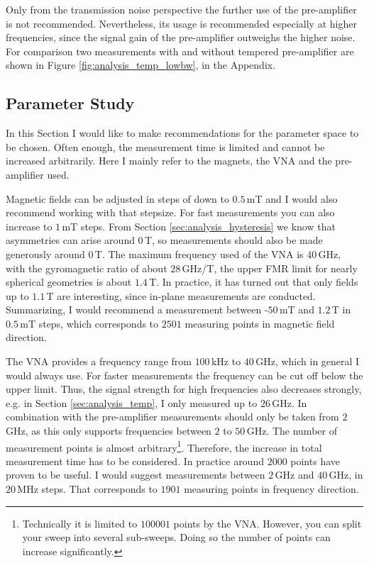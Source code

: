 Only from the transmission noise perspective the further use of the pre-amplifier is not recommended. Nevertheless, its usage is recommended especially at higher frequencies, since the signal gain of the pre-amplifier outweighs the higher noise. For comparison two measurements with and without tempered pre-amplifier are shown in Figure \ref{fig:analysis_temp_lowbw}, in the Appendix.

\newpage
\subsection{Parameter Study} \label{sec:parameter_study}
In this Section I would like to make recommendations for the parameter space to be chosen. Often enough, the measurement time is limited and cannot be increased arbitrarily. Here I mainly refer to the magnets, the VNA and the pre-amplifier used.

Magnetic fields can be adjusted in steps of down to $0.5\,$mT and I would also recommend working with that stepsize. For fast measurements you can also increase to $1\,$mT steps. From Section \ref{sec:analysis_hysteresis} we know that asymmetries can arise around $0\,$T, so  measurements should also be made generously around $0\,$T. The maximum frequency used of the VNA is $40\,$GHz, with the gyromagnetic ratio of about $28\,$GHz/T, the upper FMR limit for nearly spherical geometries is about $1.4\,$T. In practice, it has turned out that only fields up to $1.1\,$T are interesting, since in-plane measurements are conducted. Summarizing, I would recommend a measurement between -$50\,$mT and $1.2\,$T in $0.5\,$mT steps, which corresponds to $2501$ measuring points in magnetic field direction. \cite{AM430manual,IPS12010manual}

The VNA provides a frequency range from $100\,$kHz to $40\,$GHz, which in general I would always use. For faster measurements the frequency can be cut off below the upper limit. Thus, the signal strength for high frequencies also decreases strongly, e.g. in Section \ref{sec:analysis_temp}, I only measured up to $26\,$GHz. In combination with the pre-amplifier measurements should only be taken from $2\,$GHz, as this only supports frequencies between $2$ to $50\,$GHz. The number of measurement points is almost arbitrary\footnote{Technically it is limited to $100001$ points by the VNA. However, you can split your sweep into several sub-sweeps. Doing so the number of points can increase significantly.}. Therefore, the increase in total measurement time has to be considered. In practice around $2000$ points have proven to be useful.
I would suggest measurements between $2\,$GHz and $40\,$GHz, in $20\,$MHz steps. That corresponds to $1901$ measuring points in frequency direction. \cite{ZNB40manual,U7227manual}

